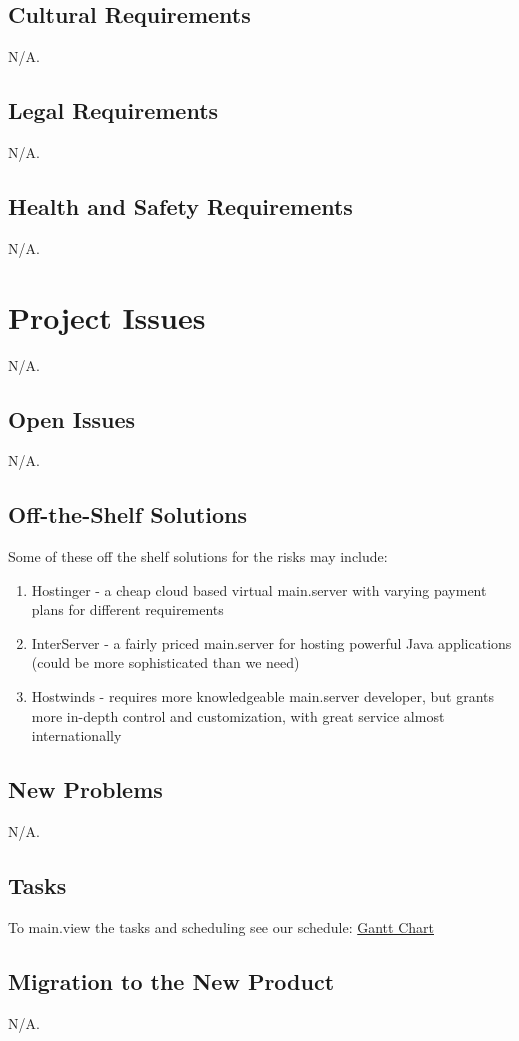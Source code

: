 \documentclass[12pt, titlepage]{article}
\begin{document}
\subsection{Cultural Requirements}
N/A.
\subsection{Legal Requirements}
N/A.
\subsection{Health and Safety Requirements}
N/A.
\section{Project Issues}
N/A.
\subsection{Open Issues}
N/A.
\subsection{Off-the-Shelf Solutions}
Some of these off the shelf solutions for the risks may include:

\begin{enumerate}
    \item Hostinger - a cheap cloud based virtual main.server with varying payment plans for different requirements
    \item InterServer - a fairly priced main.server for hosting powerful Java applications (could be more sophisticated than we need)
    \item Hostwinds - requires more knowledgeable main.server developer, but grants more in-depth control and customization, with great service almost internationally
\end{enumerate}

\subsection{New Problems}
N/A.
\subsection{Tasks}
To main.view the tasks and scheduling see our schedule: \href{run:../Documentation/Development Plan/ProjectSchedule.pdf}{Gantt Chart}
\subsection{Migration to the New Product}
N/A.
\end{document}
